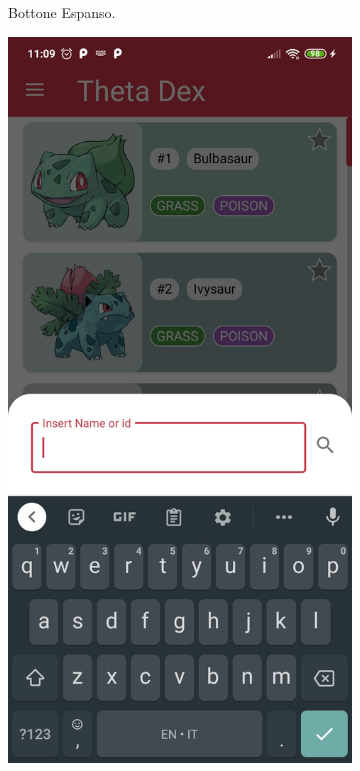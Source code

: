 \documentclass[a4paper,11pt]{article}
\begin{document}
\begin{figure}[h!]
{\begin{subfigure}[b]{0.3\linewidth}
    \caption{Bottone Espanso.}
  \end{subfigure}
  \begin{subfigure}[b]{0.3\linewidth}
    \includegraphics[width=\linewidth]{search.jpg}

\end{subfigure}}
\end{figure}
\end{document}
